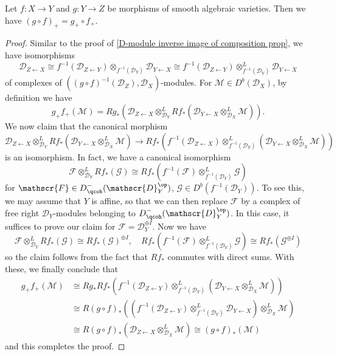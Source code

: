\begin{proposition}\label{D-module direct image composition prop}
Let $f:X\to Y$ and $g:Y\to Z$ be morphisms of smooth algebraic varieties. Then we have $(g\circ f)_+=g_+\circ f_+$.
\end{proposition}
\begin{proof}
Similar to the proof of \cref{D-module inverse image of composition prop}, we have isomorphisms
\[\mathscr{D}_{Z\leftarrow X}\cong f^{-1}(\mathscr{D}_{Z\leftarrow Y})\otimes_{f^{-1}(\mathscr{D}_Y)}\mathscr{D}_{Y\leftarrow X}\cong f^{-1}(\mathscr{D}_{Z\leftarrow Y})\otimes_{f^{-1}(\mathscr{D}_Y)}^L\mathscr{D}_{Y\leftarrow X}\]
of complexes of $((g\circ f)^{-1}(\mathscr{D}_Z),\mathscr{D}_X)$-modules. For $\mathscr{M}\in D^b(\mathscr{D}_X)$, by definition we have
\[g_+f_+(\mathscr{M})=Rg_*(\mathscr{D}_{Z\leftarrow X}\otimes_{\mathscr{D}_Y}^LRf_*(\mathscr{D}_{Y\leftarrow X}\otimes_{\mathscr{D}_X}^L\mathscr{M})).\]
We now claim that the canonical morphism
\[\mathscr{D}_{Z\leftarrow X}\otimes_{\mathscr{D}_Y}^LRf_*(\mathscr{D}_{Y\leftarrow X}\otimes_{\mathscr{D}_X}^L\mathscr{M})\to Rf_*(f^{-1}(\mathscr{D}_{Z\leftarrow X})\otimes_{f^{-1}(\mathscr{D}_Y)}^L(\mathscr{D}_{Y\leftarrow X}\otimes_{\mathscr{D}_X}^L\mathscr{M}))\]
is an isomorphism. In fact, we have a canonical isomorphism
\[\mathscr{F}\otimes_{\mathscr{D}_Y}^LRf_*(\mathscr{G})\cong Rf_*(f^{-1}(\mathscr{F})\otimes_{f^{-1}(\mathscr{D}_Y)}^L\mathscr{G})\]
for $\mathscr{F}\in D^-_{\qcoh}(\mathscr{D}_Y^{\op})$, $\mathscr{G}\in D^b(f^{-1}(\mathscr{D}_Y))$. To see this, we may assume that $Y$ is affine, so that we can then replace $\mathscr{F}$ by a complex of free right $\mathscr{D}_Y$-modules belonging to $D^-_{\qcoh}(\mathscr{D}_Y^{\op})$. In this case, it suffices to prove our claim for $\mathscr{F}=\mathscr{D}_Y^{\oplus I}$. Now we have
\[\mathscr{F}\otimes_{\mathscr{D}_Y}^LRf_*(\mathscr{G})\cong Rf_*(\mathscr{G})^{\oplus I},\quad Rf_*(f^{-1}(\mathscr{F})\otimes_{f^{-1}(\mathscr{D}_Y)}^L\mathscr{G})\cong Rf_*(\mathscr{G}^{\oplus I})\]
so the claim follows from the fact that $Rf_*$ commutes with direct sums. With these, we finally conclude that
\begin{align*}
g_+f_+(\mathscr{M})&\cong Rg_*Rf_*(f^{-1}(\mathscr{D}_{Z\leftarrow Y})\otimes_{f^{-1}(\mathscr{D}_Y)}^L(\mathscr{D}_{Y\leftarrow X}\otimes_{\mathscr{D}_X}^L\mathscr{M}))\\
&\cong R(g\circ f)_*((f^{-1}(\mathscr{D}_{Z\leftarrow Y})\otimes_{f^{-1}(\mathscr{D}_Y)}^L\mathscr{D}_{Y\leftarrow X})\otimes_{\mathscr{D}_X}^L\mathscr{M})\\
&\cong R(g\circ f)_*(\mathscr{D}_{Z\leftarrow X}\otimes_{\mathscr{D}_X}^L\mathscr{M})\cong (g\circ f)_*(\mathscr{M})
\end{align*}
and this completes the proof.
\end{proof}

